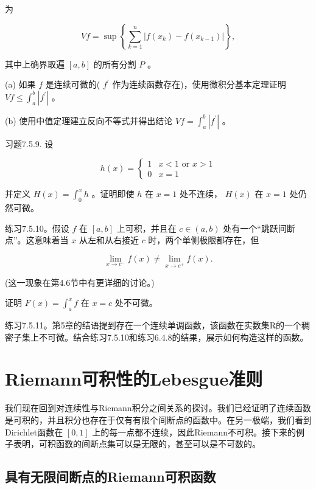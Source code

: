 为

\[
{Vf} = \sup \left\{  {\mathop{\sum }\limits_{{k = 1}}^{n}\left| {f\left( {x}_{k}\right)  - f\left( {x}_{k - 1}\right) }\right| }\right\}  ,
\]

其中上确界取遍 \(\left\lbrack  {a,b}\right\rbrack\) 的所有分割 \(P\) 。

(a) 如果 \(f\) 是连续可微的( \({f}^{\prime }\) 作为连续函数存在)，使用微积分基本定理证明 \({Vf} \leq  {\int }_{a}^{b}\left| {f}^{\prime }\right|\) 。

(b) 使用中值定理建立反向不等式并得出结论 \({Vf} = {\int }_{a}^{b}\left| {f}^{\prime }\right|\) 。

习题7.5.9. 设

\[
h\left( x\right)  = \left\{  \begin{array}{ll} 1 & x < 1\text{ or }x > 1 \\  0 & x = 1 \end{array}\right.
\]

并定义 \(H\left( x\right)  = {\int }_{0}^{x}h\) 。证明即使 \(h\) 在 \(x = 1\) 处不连续， \(H\left( x\right)\) 在 \(x = 1\) 处仍然可微。

练习7.5.10。假设 \(f\) 在 \(\left\lbrack  {a,b}\right\rbrack\) 上可积，并且在 \(c \in  \left( {a,b}\right)\) 处有一个“跳跃间断点”。这意味着当 \(x\) 从左和从右接近 \(c\) 时，两个单侧极限都存在，但

\[
\mathop{\lim }\limits_{{x \rightarrow  {c}^{ - }}}f\left( x\right)  \neq  \mathop{\lim }\limits_{{x \rightarrow  {c}^{ + }}}f\left( x\right) .
\]

(这一现象在第4.6节中有更详细的讨论。)

证明 \(F\left( x\right)  = {\int }_{a}^{x}f\) 在 \(x = c\) 处不可微。

练习7.5.11。第5章的结语提到存在一个连续单调函数，该函数在实数集R的一个稠密子集上不可微。结合练习7.5.10和练习6.4.8的结果，展示如何构造这样的函数。

\section{Riemann可积性的Lebesgue准则}
\label{sec:7.6}
我们现在回到对连续性与Riemann积分之间关系的探讨。我们已经证明了连续函数是可积的，并且积分也存在于仅有有限个间断点的函数中。在另一极端，我们看到Dirichlet函数在 \(\left\lbrack  {0,1}\right\rbrack\) 上的每一点都不连续，因此Riemann不可积。接下来的例子表明，可积函数的间断点集可以是无限的，甚至可以是不可数的。

\subsection{具有无限间断点的Riemann可积函数}

